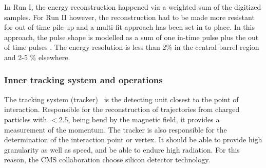 In Run I, the energy reconstruction happened  via a weighted sum of the digitized samples\cite{Chatrchyan:2013dga}. For Run II however, the reconstruction had to be made more resistant for out of time pile up and a multi-fit approach has been set in to place. In this approach, the pulse shape is modelled as a sum of one in-time pulse plus the out of time pulses \cite{1748-0221-12-01-C01069}. The energy resolution is less than 2\%  in the central barrel region and 2-5 \% elsewhere.

\subsubsection{Inner tracking system and operations}
The tracking system (tracker)~\cite{Chatrchyan:1704291} is the detecting unit closest to the point of interaction. Responsible for the reconstruction of  trajectories from charged particles with \abspsrap $<2.5$, being bend by the magnetic field, it provides a measurement of the momentum. The tracker is also responsible for the determination of the interaction point or vertex. It should be able to provide high granularity as well as speed, and be able to endure high radiation. For this reason, the CMS collaboration choose silicon detector technology.

